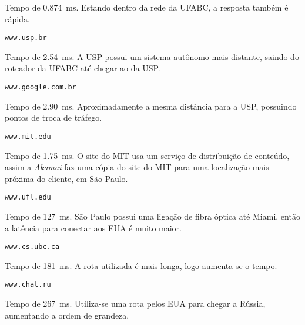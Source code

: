\begin{parts}
\begin{subparts}
    \begin{solution}
      Tempo de \SI{0.874}{\milli\second}. Estando dentro da rede da 
      UFABC, a resposta também é rápida.
    \end{solution}

    \subpart
    \verb|www.usp.br|

    \begin{solution}
      Tempo de \SI{2.54}{\milli\second}. A USP possui um sistema 
      autônomo mais distante, saindo do roteador da UFABC até 
      chegar ao da USP.
    \end{solution}

    \subpart
    \verb|www.google.com.br|

    \begin{solution}
      Tempo de \SI{2.90}{\milli\second}. Aproximadamente a mesma 
      distância para a USP, possuindo pontos de troca de tráfego.
    \end{solution}

    \pagebreak
    \subpart
    \verb|www.mit.edu|

    \begin{solution}
      Tempo de \SI{1.75}{\milli\second}. O site do MIT usa um serviço 
      de distribuição de conteúdo, assim a \emph{Akamai} faz uma cópia
      do site do MIT para uma localização mais próxima do cliente, em 
      São Paulo.
    \end{solution}

    \subpart
    \verb|www.ufl.edu|

    \begin{solution}
      Tempo de \SI{127}{\milli\second}. São Paulo possui uma ligação 
      de fibra óptica até Miami, então a latência para conectar aos 
      EUA é muito maior.
    \end{solution}

    \subpart
    \verb|www.cs.ubc.ca|

    \begin{solution}
      Tempo de \SI{181}{\milli\second}. A rota utilizada é mais longa, 
      logo aumenta-se o tempo.
    \end{solution}

    \subpart
    \verb|www.chat.ru|

    \begin{solution}
      Tempo de \SI{267}{\milli\second}. Utiliza-se uma rota pelos 
      EUA para chegar a Rússia, aumentando a ordem de grandeza.
    \end{solution}
  \end{subparts}
\end{parts}

